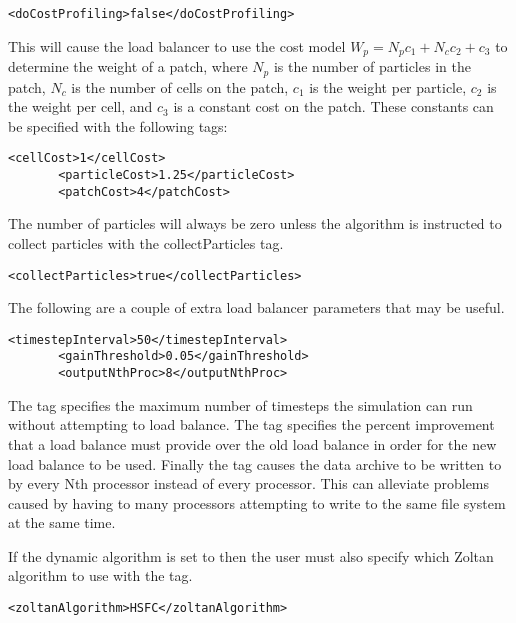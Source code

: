 \begin{Verbatim}[fontsize=\footnotesize]
       <doCostProfiling>false</doCostProfiling>
\end{Verbatim}

This will cause the load balancer to use the cost model $W_p=N_pc_1+N_cc_2+c_3$ to 
determine the weight of a patch, where $N_p$ is the number of particles 
in the patch, $N_c$ is the number of cells on the patch, $c_1$ is the weight per
particle, $c_2$ is the weight per cell, and $c_3$ is a constant cost on the
patch.  These constants can be specified with the following tags:

\begin{Verbatim}[fontsize=\footnotesize]
       <cellCost>1</cellCost>
       <particleCost>1.25</particleCost>
       <patchCost>4</patchCost>
\end{Verbatim}

The number of particles will always be zero unless the algorithm is instructed to
collect particles with the collectParticles tag.  

\begin{Verbatim}[fontsize=\footnotesize]
       <collectParticles>true</collectParticles>
\end{Verbatim}

The following are a couple of extra load balancer parameters that may be useful.
\begin{Verbatim}[fontsize=\footnotesize]
       <timestepInterval>50</timestepInterval>
       <gainThreshold>0.05</gainThreshold>
       <outputNthProc>8</outputNthProc>
\end{Verbatim}

The  tag specifies the maximum number of timesteps the simulation
can run without attempting to load balance.  The  tag specifies the 
percent improvement that a load balance must provide over the old load balance in 
order for the new load balance to be used.  Finally the  tag causes
the data archive to be written to by every Nth processor instead of every processor.  
This can alleviate problems caused by having to many processors attempting to write 
to the same file system at the same time. 

If the dynamic algorithm is set to  then the user must also specify which
Zoltan algorithm to use with the  tag.  

\begin{Verbatim}[fontsize=\footnotesize]
       <zoltanAlgorithm>HSFC</zoltanAlgorithm>
\end{Verbatim}

